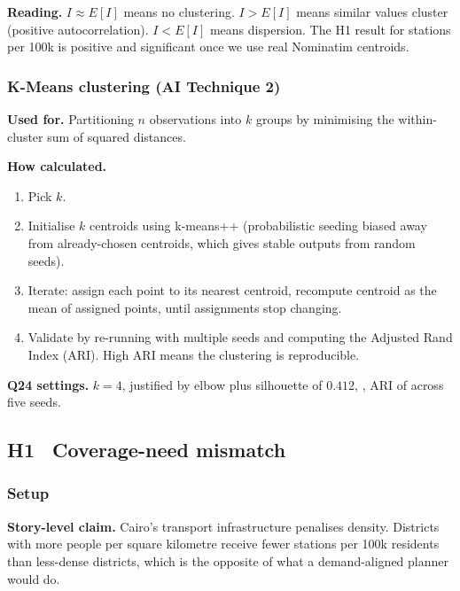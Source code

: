 \textbf{Reading.} $I \approx E[I]$ means no clustering. $I > E[I]$
means similar values cluster (positive autocorrelation). $I < E[I]$
means dispersion. The H1 result for stations per 100k is positive
and significant once we use real Nominatim centroids.

\subsubsection{K-Means clustering (AI Technique 2)}

\textbf{Used for.} Partitioning $n$ observations into $k$ groups by
minimising the within-cluster sum of squared distances.

\textbf{How calculated.}
\begin{enumerate}
  \item Pick $k$.
  \item Initialise $k$ centroids using k-means++ (probabilistic seeding
        biased away from already-chosen centroids, which gives stable
        outputs from random seeds).
  \item Iterate: assign each point to its nearest centroid, recompute
        centroid as the mean of assigned points, until assignments
        stop changing.
  \item Validate by re-running with multiple seeds and computing the
        Adjusted Rand Index (ARI). High ARI means the clustering is
        reproducible.
\end{enumerate}

\textbf{Q24 settings.} $k = 4$, justified by elbow plus silhouette
of $0.412$, , ARI of  across five seeds.

\subsection{H1 \textbullet\ Coverage-need mismatch}
\label{sec:h1}

\subsubsection{Setup}

\textbf{Story-level claim.} Cairo's transport infrastructure penalises
density. Districts with more people per square kilometre receive fewer
stations per 100k residents than less-dense districts, which is the
opposite of what a demand-aligned planner would do.

